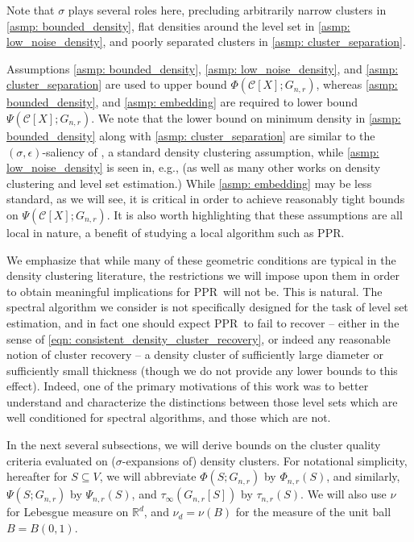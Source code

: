 \documentclass{article}
\newcommand{\Reals}{\mathbb{R}}
\newcommand{\Rd}{\Reals^d}
\newcommand{\1}{\mathbf{1}}
\newcommand{\Xbf}{X}             %
\newcommand{\Cset}{\mathcal{C}}
\newcommand{\ppr}{{\sc PPR}}
\newcommand{\pprspace}{{\sc PPR~}}
\theoremstyle{aldenthm}
\theoremstyle{aldenrmrk}
\begin{document}
Note that $\sigma$ plays several roles here, precluding arbitrarily narrow
clusters in \ref{asmp: bounded_density}, flat densities around the level set in \ref{asmp: low_noise_density}, and poorly separated clusters in \ref{asmp: cluster_separation}. 

Assumptions \ref{asmp: bounded_density}, \ref{asmp: low_noise_density},
and \ref{asmp: cluster_separation} are used to upper bound $\Phi(\Cset[\Xbf];
G_{n,r})$, whereas \ref{asmp: bounded_density}, and \ref{asmp: embedding} are required to lower bound $\Psi(\Cset[\Xbf]; G_{n,r})$. We note that the
lower bound on minimum density in \ref{asmp: bounded_density} along with \ref{asmp:  
cluster_separation} are similar to the $(\sigma,\epsilon)$-saliency of
\citep{chaudhuri2010}, a standard density clustering assumption, while
\ref{asmp: low_noise_density} is seen in, e.g., \citep{singh2009} (as well as
many other works on density clustering and level set estimation.) While \ref{asmp: embedding} may be less standard, as we will see, it is critical in order to achieve reasonably tight bounds on $\Psi(\Cset[\Xbf];
G_{n,r})$.  It is also worth
highlighting that these assumptions are all local in nature, a benefit of
studying a local algorithm such as \ppr.



We emphasize that while many of these geometric conditions are typical in the density clustering literature, the restrictions we will impose upon them in order to obtain meaningful implications for \pprspace will not be. This is natural. The spectral algorithm we consider is not specifically designed for the task of level set estimation, and in fact one should expect \pprspace to fail to recover -- either in the sense of \eqref{eqn: consistent_density_cluster_recovery}, or indeed any reasonable notion of cluster recovery -- a density cluster of sufficiently large diameter or sufficiently small thickness (though we do not provide any lower bounds to this effect). Indeed, one of the primary motivations of this work was to better understand and characterize the distinctions between those level sets which are well conditioned for spectral algorithms, and those which are not.


In the next several subsections, we will derive bounds on the cluster quality
criteria evaluated on ($\sigma$-expansions of) density clusters. For notational simplicity,
hereafter for $S \subseteq V$, we will abbreviate $\Phi(S; G_{n,r})$ by
$\Phi_{n,r}(S)$, and similarly, $\Psi(S; G_{n,r})$ by $\Psi_{n,r}(S)$, and
$\tau_{\infty}(G_{n,r}[S])$ by $\tau_{n,r}(S)$. We will also use $\nu$ for
Lebesgue measure on $\Rd$, and $\nu_d = \nu(B)$ for the measure of the unit ball
$B=B(0,1)$.  
\end{document}
